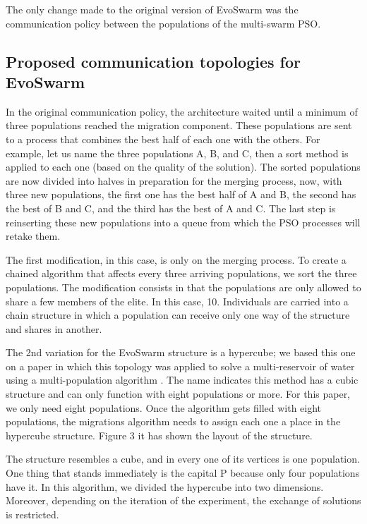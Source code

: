\documentclass[runningheads]{llncs}
\begin{document}
The only change made to the original version of EvoSwarm \cite{b18} was the
communication policy between the populations of the multi-swarm PSO.

\subsection{Proposed communication topologies for EvoSwarm} 

In the original communication policy, the architecture waited until a minimum of
three populations reached the migration component. These populations are sent to
a process that combines the best half of each one with the others. For example,
let us name the three populations A, B, and C, then a sort method is applied to
each one (based on the quality of the solution). The sorted populations are now
divided into halves in preparation for the merging process, now, with three new
populations, the first one has the best half of A and B, the second has the best
of B and C, and the third has the best of A and C. The last step is reinserting
these new populations into a queue from which the PSO processes will retake
them.

The first modification, in this case, is only on the merging process. To create
a chained algorithm that affects every three arriving populations, we sort the
three populations. The modification consists in that the populations are only
allowed to share a few members of the elite. In this case, 10. Individuals are
carried into a chain structure in which a population can receive only one way of
the structure and shares in another.

The 2nd variation for the EvoSwarm structure is a hypercube; we based this one
on a paper in which this topology was applied to solve a multi-reservoir of
water using a multi-population algorithm \cite{b20}. The name indicates this
method has a cubic structure and can only function with eight populations or
more. For this paper, we only need eight populations. Once the algorithm gets
filled with eight populations, the migrations algorithm needs to assign each one
a place in the hypercube structure. Figure 3 it has shown the layout of the
structure.

The structure resembles a cube, and in every one of its vertices is one
population. One thing that stands immediately is the capital P because only four
populations have it. In this algorithm, we divided the hypercube into two
dimensions. Moreover, depending on the iteration of the experiment, the exchange
of solutions is restricted.
\end{document}
